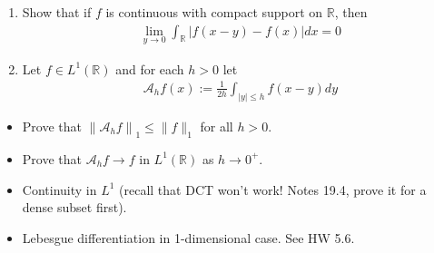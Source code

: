 \begin{enumerate}
\def\labelenumi{\alph{enumi}.}
\item
  Show that if \(f\) is continuous with compact support on
  \({\mathbb{R}}\), then
  \begin{align*}
  \lim _{y \rightarrow 0} \int_{\mathbb{R}}|f(x-y)-f(x)| d x=0
  \end{align*}
\item
  Let \(f\in L^1({\mathbb{R}})\) and for each \(h > 0\) let
  \begin{align*}
  \mathcal{A}_{h} f(x):=\frac{1}{2 h} \int_{|y| \leq h} f(x-y) d y
  \end{align*}
\end{enumerate}

\begin{itemize}
\item
  Prove that \(\left\|\mathcal{A}_{h} f\right\|_{1} \leq\|f\|_{1}\) for
  all \(h > 0\).
\item
  Prove that \(\mathcal{A}_h f \to f\) in \(L^1({\mathbb{R}})\) as
  \(h \to 0^+\).
\end{itemize}


\begin{concept}

\envlist

\begin{itemize}
\tightlist
\item
  Continuity in \(L^1\) (recall that DCT won't work! Notes 19.4, prove
  it for a dense subset first).
\item
  Lebesgue differentiation in 1-dimensional case. See HW 5.6.
\end{itemize}

\end{concept}

